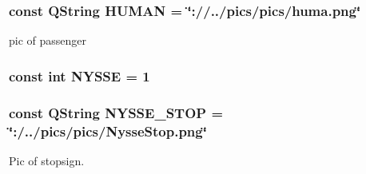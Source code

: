 \hypertarget{actoritem_8hh_a919ee1b297d205cded0f0dc03ade1cfd}{
\subsubsection[{H\-U\-M\-A\-N}]{\setlength{\rightskip}{0pt plus 5cm}const Q\-String H\-U\-M\-A\-N = \char`\"{}\-://../pics/pics/huma.\-png\char`\"{}}}\label{actoritem_8hh_a919ee1b297d205cded0f0dc03ade1cfd}


pic of passenger 

\hypertarget{actoritem_8hh_a184d5b62435541e060c4dd4f179bec92}{
\subsubsection[{N\-Y\-S\-S\-E}]{\setlength{\rightskip}{0pt plus 5cm}const int N\-Y\-S\-S\-E = 1}}\label{actoritem_8hh_a184d5b62435541e060c4dd4f179bec92}
\hypertarget{actoritem_8hh_aa4b129297bf7c3a2ab33895c4ec37ade}{
\subsubsection[{N\-Y\-S\-S\-E\-\_\-\-S\-T\-O\-P}]{\setlength{\rightskip}{0pt plus 5cm}const Q\-String N\-Y\-S\-S\-E\-\_\-\-S\-T\-O\-P = \char`\"{}\-:/../pics/pics/Nysse\-Stop.\-png\char`\"{}}}\label{actoritem_8hh_aa4b129297bf7c3a2ab33895c4ec37ade}


Pic of stopsign. 

